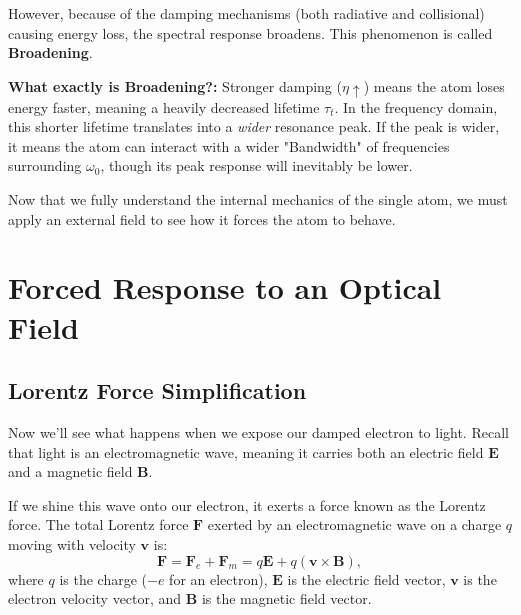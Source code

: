However, because of the damping mechanisms (both radiative and collisional) causing energy loss, the spectral response broadens. This phenomenon is called \textbf{Broadening}.

\textbf{What exactly is Broadening?:} Stronger damping ($\eta \uparrow$) means the atom loses energy faster, meaning a heavily decreased lifetime $\tau_t$. In the frequency domain, this shorter lifetime translates into a \emph{wider} resonance peak.
If the peak is wider, it means the atom can interact with a wider "Bandwidth" of frequencies surrounding $\omega_0$, though its peak response will inevitably be lower.

Now that we fully understand the internal mechanics of the single atom, we must apply an external field to see how it forces the atom to behave.

\section{Forced Response to an Optical Field}
\subsection{Lorentz Force Simplification}
Now we'll see what happens when we expose our damped electron to light. Recall that light is an electromagnetic wave, meaning it carries both an electric field $\bm{E}$ and a magnetic field $\bm{B}$.

If we shine this wave onto our electron, it exerts a force known as the Lorentz force. The total Lorentz force $\bm{F}$ exerted by an electromagnetic wave on a charge $q$ moving with velocity $\bm{v}$ is:
\begin{equation*}
    \bm{F}=\bm{F}_e+\bm{F}_m=q\bm{E}+q(\bm{v}\times\bm{B}),
\end{equation*}
where $q$ is the charge ($-e$ for an electron), $\bm{E}$ is the electric field vector, $\bm{v}$ is the electron velocity vector, and $\bm{B}$ is the magnetic field vector.

